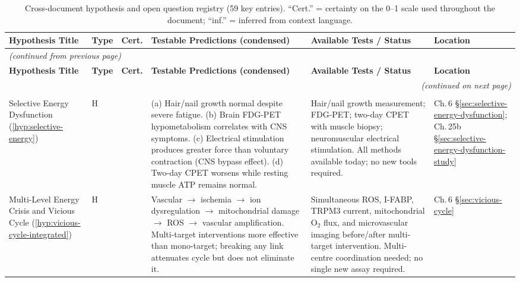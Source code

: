 \begin{longtable}{%
  p{3.0cm}
  >{\centering\arraybackslash}p{0.55cm}
  >{\centering\arraybackslash}p{1.0cm}
  p{3.8cm}
  p{3.8cm}
  p{2.2cm}
}

\caption{Cross-document hypothesis and open question registry (59 key entries).
  ``Cert.'' = certainty on the 0--1 scale used throughout the document;
  ``inf.'' = inferred from context language.
  \label{tab:hypothesis-registry}}\\

\toprule
\textbf{Hypothesis Title} &
\textbf{Type} &
\textbf{Cert.} &
\textbf{Testable Predictions (condensed)} &
\textbf{Available Tests / Status} &
\textbf{Location} \\
\midrule
\endfirsthead

\multicolumn{6}{l}{\footnotesize\textit{(continued from previous page)}}\\
\toprule
\textbf{Hypothesis Title} &
\textbf{Type} &
\textbf{Cert.} &
\textbf{Testable Predictions (condensed)} &
\textbf{Available Tests / Status} &
\textbf{Location} \\
\midrule
\endhead

\midrule
\multicolumn{6}{r}{\footnotesize\textit{(continued on next page)}}\\
\endfoot

\bottomrule
\endlastfoot

\multicolumn{6}{l}{\small\textit{\textbf{Domain 1: Energy Metabolism}}} \\[2pt]

Selective Energy Dysfunction
(\ref{hyp:selective-energy})
&
H & 0.55
&
(a) Hair/nail growth normal despite severe fatigue.
(b) Brain FDG-PET hypometabolism correlates with CNS symptoms.
(c) Electrical stimulation produces greater force than voluntary contraction
(CNS bypass effect).
(d) Two-day CPET worsens while resting muscle ATP remains normal.
&
Hair/nail growth measurement; FDG-PET; two-day CPET with muscle biopsy;
neuromuscular electrical stimulation.
All methods available today; no new tools required.
&
Ch.\,6 \S\ref{sec:selective-energy-dysfunction};
Ch.\,25b \S\ref{sec:selective-energy-dysfunction-study} \\[6pt]

Multi-Level Energy Crisis and Vicious Cycle
(\ref{hyp:vicious-cycle-integrated})
&
H & 0.55
&
Vascular $\to$ ischemia $\to$ ion dysregulation $\to$ mitochondrial damage
$\to$ ROS $\to$ vascular amplification.
Multi-target interventions more effective than mono-target; breaking any link
attenuates cycle but does not eliminate it.
&
Simultaneous ROS, I-FABP, TRPM3 current, mitochondrial O$_2$ flux, and
microvascular imaging before/after multi-target intervention.
Multi-centre coordination needed; no single new assay required.
&
Ch.\,6 \S\ref{sec:vicious-cycle} \\[6pt]


\end{longtable}
